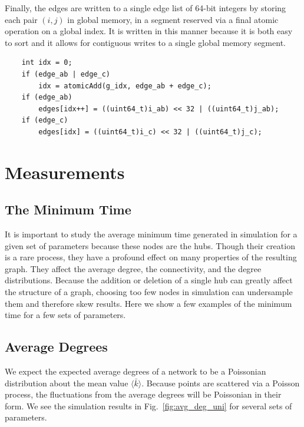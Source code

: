 \documentclass[preprint,notitlepage,amsmath,amssymb,floatfix]{revtex4-1}
\begin{document}
\noindent Finally, the edges are written to a single edge list of 64-bit integers by storing each pair $(i,j)$ in global memory, in a segment reserved via a final atomic operation on a global index.  
It is written in this manner because it is both easy to sort and it allows for contiguous writes to a single global memory segment.

\begin{lstlisting}
	int idx = 0;
	if (edge_ab | edge_c)
		idx = atomicAdd(g_idx, edge_ab + edge_c);
	if (edge_ab)
		edges[idx++] = ((uint64_t)i_ab) << 32 | ((uint64_t)j_ab);
	if (edge_c)
		edges[idx] = ((uint64_t)i_c) << 32 | ((uint64_t)j_c);
\end{lstlisting}

\section{Measurements}
\subsection{The Minimum Time}
It is important to study the average minimum time generated in simulation for a given set of parameters because these nodes are the hubs.
Though their creation is a rare process, they have a profound effect on many properties of the resulting graph.
They affect the average degree, the connectivity, and the degree distributions.
Because the addition or deletion of a single hub can greatly affect the structure of a graph, choosing too few nodes in simulation can undersample them and therefore skew results.
Here we show a few examples of the minimum time for a few sets of parameters.

\subsection{Average Degrees}
We expect the expected average degrees of a network to be a Poissonian distribution about the mean value $\langle\bar{k}\rangle$.  
Because points are scattered via a Poisson process, the fluctuations from the average degrees will be Poissonian in their form.
We see the simulation results in Fig.~\ref{fig:avg_deg_uni} for several sets of parameters.
\end{document}
